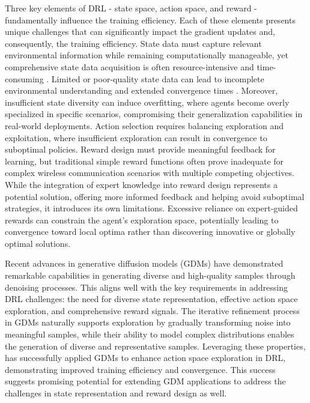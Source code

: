 \documentclass[comsoc,journal]{IEEEtran}
\begin{document}
Three key elements of DRL - state space, action space, and reward - fundamentally influence the training efficiency. Each of these elements presents unique challenges that can significantly impact the gradient updates and, consequently, the training efficiency. State data must capture relevant environmental information while remaining computationally manageable, yet comprehensive state data acquisition is often resource-intensive and time-consuming \cite{qian2024offline,wang2021provably}. Limited or poor-quality state data can lead to incomplete environmental understanding and extended convergence times \cite{wang2022vrl3}. Moreover, insufficient state diversity can induce overfitting, where agents become overly specialized in specific scenarios, compromising their generalization capabilities in real-world deployments\cite{mohi2024optimizing}. Action selection requires balancing exploration and exploitation, where insufficient exploration can result in convergence to suboptimal policies\cite{chen2023structure}. Reward design must provide meaningful feedback for learning, but traditional simple reward functions\cite{michaud2020understanding,lyu2020movement} often prove inadequate for complex wireless communication scenarios with multiple competing objectives. While the integration of expert knowledge into reward design represents a potential solution\cite{du2024enhancing}, offering more informed feedback and helping avoid suboptimal strategies, it introduces its own limitations. Excessive reliance on expert-guided rewards can constrain the agent's exploration space, potentially leading to convergence toward local optima rather than discovering innovative or globally optimal solutions.

Recent advances in generative diffusion models (GDMs) \cite{sohl2015deep} have demonstrated remarkable capabilities in generating diverse and high-quality samples through denoising processes. This aligns well with the key requirements in addressing DRL challenges: the need for diverse state representation, effective action space exploration, and comprehensive reward signals. The iterative refinement process in GDMs naturally supports exploration by gradually transforming noise into meaningful samples, while their ability to model complex distributions enables the generation of diverse and representative samples. Leveraging these properties, \cite{du2024enhancing} has successfully applied GDMs to enhance action space exploration in DRL, demonstrating improved training efficiency and convergence. This success suggests promising potential for extending GDM applications to address the challenges in state representation and reward design as well.
\end{document}
